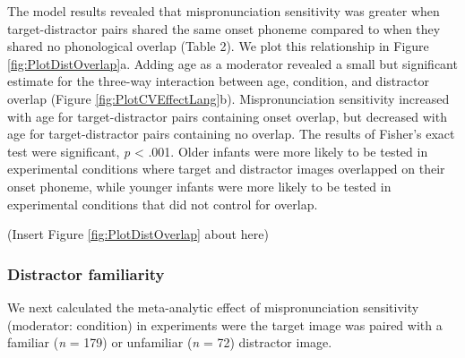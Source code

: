 \documentclass[man, noextraspace]{apa6}
\begin{document}
The model results revealed that mispronunciation sensitivity was greater when target-distractor pairs shared the same onset phoneme compared to when they shared no phonological overlap (Table 2). We plot this relationship in Figure \ref{fig:PlotDistOverlap}a. Adding age as a moderator revealed a small but significant estimate for the three-way interaction between age, condition, and distractor overlap (Figure \ref{fig:PlotCVEffectLang}b). Mispronunciation sensitivity increased with age for target-distractor pairs containing onset overlap, but decreased with age for target-distractor pairs containing no overlap. The results of Fisher's exact test were significant, \emph{p} \textless{} .001. Older infants were more likely to be tested in experimental conditions where target and distractor images overlapped on their onset phoneme, while younger infants were more likely to be tested in experimental conditions that did not control for overlap.

(Insert Figure \ref{fig:PlotDistOverlap} about here)

\hypertarget{distractor-familiarity}{%
\subsubsection{Distractor familiarity}\label{distractor-familiarity}}

We next calculated the meta-analytic effect of mispronunciation sensitivity (moderator: condition) in experiments were the target image was paired with a familiar (\emph{n} = 179) or unfamiliar (\emph{n} = 72) distractor image.
\end{document}
